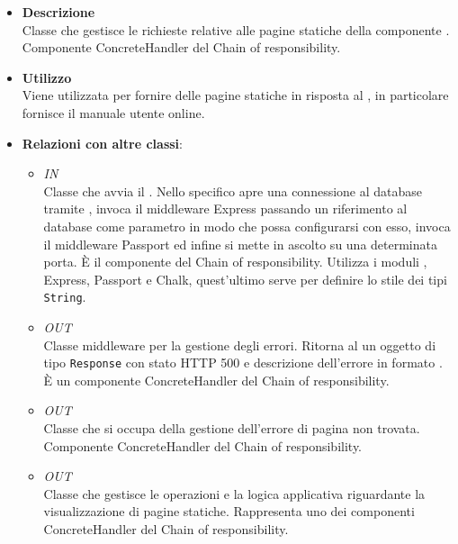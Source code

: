 \begin{itemize}
\item \textbf{Descrizione}\\
Classe che gestisce le richieste relative alle pagine statiche della componente . Componente ConcreteHandler del  Chain of responsibility.
\item \textbf{Utilizzo}\\
Viene utilizzata per fornire delle pagine  statiche in risposta al , in particolare fornisce il manuale utente online.
\item \textbf{Relazioni con altre classi}:
\begin{itemize}
\item \textit{IN} \hyperref[\nogloxy{Premi::Back-End::Server}]{}\\
Classe che avvia il . Nello specifico apre una connessione al database tramite , invoca il middleware Express passando un riferimento al database  come parametro in modo che possa configurarsi con esso, invoca il middleware Passport ed infine si mette in ascolto su una determinata porta. \`E il componente  del  Chain of responsibility. Utilizza i moduli , Express, Passport e Chalk, quest’ultimo serve per definire lo stile dei tipi \texttt{String}.
\item \textit{OUT} \hyperref[\nogloxy{Premi::Back-End::App::Controllers::ErrorHandler}]{}\\
Classe middleware per la gestione degli errori. Ritorna al  un oggetto di tipo \texttt{Response} con stato HTTP 500 e descrizione dell'errore in formato . \`E un componente ConcreteHandler del  Chain of responsibility.
\item \textit{OUT} \hyperref[\nogloxy{Premi::Back-End::App::Controllers::NotFoundHandler}]{}\\
Classe che si occupa della gestione dell'errore di pagina non trovata. Componente
ConcreteHandler del  Chain of responsibility.
\item \textit{OUT} \hyperref[\nogloxy{Premi::Back-End::App::Controllers::StaticController}]{}\\
Classe che gestisce le operazioni e la logica applicativa riguardante la visualizzazione di pagine  statiche. Rappresenta uno dei componenti ConcreteHandler del  Chain of responsibility.

\end{itemize}
\end{itemize}
